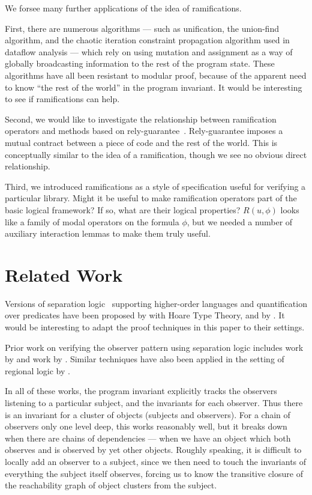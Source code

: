 \documentclass[preprint,natbib]{sigplanconf}
\begin{document}
We forsee many further applications of the idea of ramifications.

First, there are numerous algorithms --- such as unification, the
union-find algorithm, and the chaotic iteration constraint propagation
algorithm used in dataflow analysis --- which rely on using mutation
and assignment as a way of globally broadcasting information to the
rest of the program state. These algorithms have all been resistant to
modular proof, because of the apparent need to know ``the rest of the
world'' in the program invariant. It would be interesting to see if
ramifications can help.

Second, we would like to investigate the relationship between
ramification operators and methods based on
rely-guarantee~\cite{rely-guarantee-jones}. Rely-guarantee imposes a
mutual contract between a piece of code and the rest of the world.
This is conceptually similar to the idea of a ramification, though we
see no obvious direct relationship.

Third, we introduced ramifications as a style of
specification useful for verifying a particular library. Might it be
 useful to make ramification operators part of the basic
logical framework? If so, what are their logical properties? $R(u,
\phi)$ looks like a family of modal operators on the formula $\phi$, but
we needed a number of auxiliary interaction
lemmas to make them truly useful.

\section{Related Work}

Versions of separation logic~\cite{sep-logic} supporting higher-order
languages and quantification over predicates have been proposed by
\citet{htt} with Hoare Type Theory, and by
\citet{parkinson-bierman}. It would be interesting to adapt the
proof techniques in this paper to their settings.

Prior work on verifying the observer pattern using separation logic
includes work by \citet{tldi09,ftfjp07} and work by
\citet{parkinson-iwaco-07}. Similar techniques have also been applied
in the setting of regional logic by \citet{banerjee-naumann-regions}.

In all of these works, the program invariant explicitly tracks the
observers listening to a particular subject, and the invariants for
each observer. Thus there is an invariant for a cluster of objects
(subjects and observers). For a chain of observers only one level
deep, this works reasonably well, but it breaks down when there are
chains of dependencies --- when we have an object which both observes
and is observed by yet other objects. Roughly speaking, it is
difficult to locally add an observer to a subject, since we then need
to touch the invariants of everything the subject itself observes,
forcing us to know the transitive closure of the reachability graph of
object clusters from the subject. 
\end{document}
